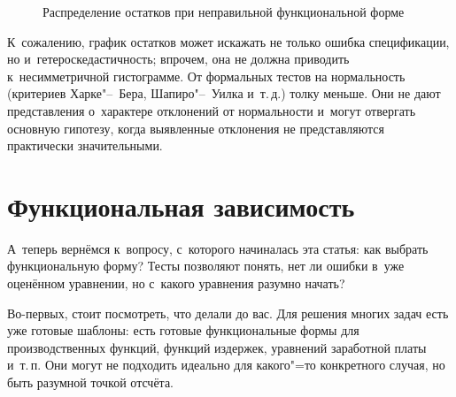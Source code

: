 \documentclass[11pt]{article}
\begin{document}
\begin{figure}[htbp]
	\centering
	 \quad
	\caption{Распределение остатков при неправильной функциональной форме}\label{fig:histqq}
\end{figure}


К~сожалению, график остатков может искажать не только ошибка спецификации, но и~гетероскедастичность; впрочем, она не должна приводить к~несимметричной гистограмме. От формальных тестов на нормальность (критериев Харке"--~Бера, Шапиро"--~Уилка и~т.\,д.) толку меньше. Они не дают представления о~характере отклонений от нормальности и~могут отвергать основную гипотезу, когда выявленные отклонения не представляются практически значительными.

\section{Функциональная зависимость}

А~теперь вернёмся к~вопросу, с~которого начиналась эта статья: как выбрать функциональную форму? Тесты позволяют понять, нет ли ошибки в~уже оценённом уравнении, но с~какого уравнения разумно начать?

Во-первых, стоит посмотреть, что делали до вас. Для решения многих задач есть уже готовые шаблоны: есть готовые функциональные формы для производственных функций, функций издержек, уравнений заработной платы и~т.\,п. Они могут не подходить идеально для какого"=то конкретного случая, но быть разумной точкой отсчёта.
\end{document}

